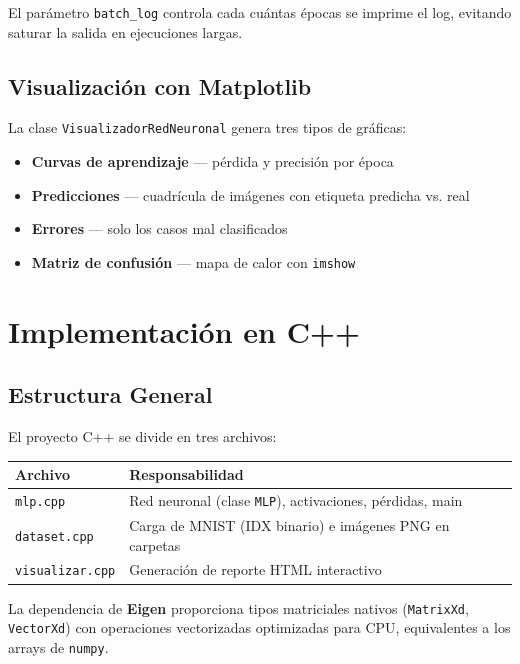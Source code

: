 El parámetro \texttt{batch\_log} controla cada cuántas épocas se imprime el log, evitando
saturar la salida en ejecuciones largas.

\subsection{Visualización con Matplotlib}

La clase \texttt{VisualizadorRedNeuronal} genera tres tipos de gráficas:

\begin{itemize}[noitemsep]
    \item \textbf{Curvas de aprendizaje} --- pérdida y precisión por época
    \item \textbf{Predicciones} --- cuadrícula de imágenes con etiqueta predicha vs. real
    \item \textbf{Errores} --- solo los casos mal clasificados
    \item \textbf{Matriz de confusión} --- mapa de calor con \texttt{imshow}
\end{itemize}

\section{Implementación en C++}

\subsection{Estructura General}

El proyecto C++ se divide en tres archivos:

\begin{center}
\begin{tabular}{ll}
\toprule
\textbf{Archivo} & \textbf{Responsabilidad} \\
\midrule
\texttt{mlp.cpp}       & Red neuronal (clase \texttt{MLP}), activaciones, pérdidas, main \\
\texttt{dataset.cpp}   & Carga de MNIST (IDX binario) e imágenes PNG en carpetas \\
\texttt{visualizar.cpp}& Generación de reporte HTML interactivo \\
\bottomrule
\end{tabular}
\end{center}

La dependencia de \textbf{Eigen} proporciona tipos matriciales nativos (\texttt{MatrixXd},
\texttt{VectorXd}) con operaciones vectorizadas optimizadas para CPU, equivalentes a los
arrays de \texttt{numpy}.

